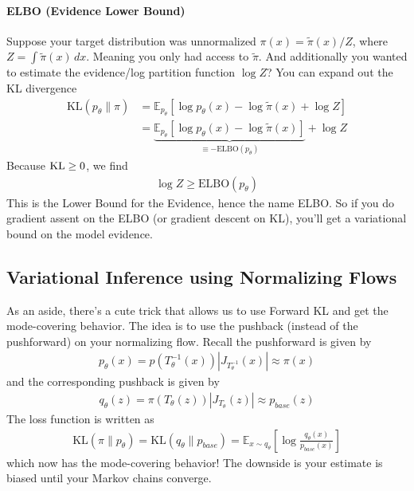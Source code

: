 \paragraph{ELBO (Evidence Lower Bound)} Suppose your target distribution was unnormalized $\pi(x) = \tilde \pi(x) / Z$, where $Z = \int \tilde \pi(x) \, dx$. Meaning you only had access to $\tilde \pi$. And additionally you wanted to estimate the evidence/log partition function $\log Z$? You can expand out the KL divergence
\begin{align}
	\text{KL}(p_\theta \| \pi) & = \mathbb E_{p_\theta}[\log p_\theta(x)-\log \tilde \pi(x) + \log Z] \\
	& = \underbrace{\mathbb E_{p_\theta}[\log p_\theta(x)-\log \tilde \pi(x)]}_{\equiv - \text{ELBO}(p_\theta)} + \log Z
\end{align}
Because $\operatorname{KL} \geq 0$, we find 
\begin{align}
	\log Z \geq \text{ELBO}(p_\theta)
\end{align} 
This is the Lower Bound for the Evidence, hence the name ELBO. So if you do gradient assent on the ELBO (or gradient descent on KL), you'll get a variational bound on the model evidence.


\subsection{Variational Inference using Normalizing Flows}
\begin{sidework}
	As an aside, there's a cute trick that allows us to use Forward KL and get the mode-covering behavior. The idea is to use the pushback (instead of the pushforward) on your normalizing flow. Recall the pushforward is given by
	\begin{align}
		p_\theta(x) = p(T_\theta^{-1}(x)) | J_{T^{-1}_\theta}(x)| \approx \pi(x)
	\end{align}
	and the corresponding pushback is given by
	\begin{align}
		q_\theta(z) = \pi(T_\theta(z)) |J_{T_\theta}(z)| \approx p_{base}(z)
	\end{align}
	The loss function is written as
	\begin{align}
		\text{KL}(\pi \| p_\theta) = \text{KL}(q_\theta \| p_{base}) = \mathbb E_{x \sim q_\theta} \left[\log \frac{q_\theta(x)}{p_{base}(x)} \right]
	\end{align}
	which now has the mode-covering behavior! The downside is your estimate is biased until your Markov chains converge. 
\end{sidework}



